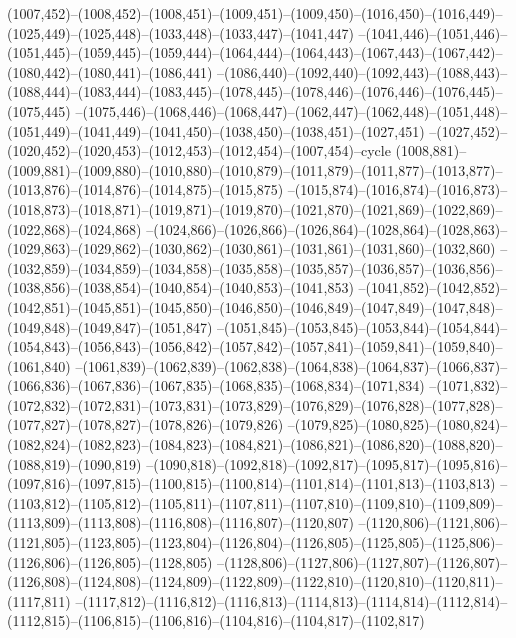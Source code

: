 (1007,452)--(1008,452)--(1008,451)--(1009,451)--(1009,450)--(1016,450)--(1016,449)--(1025,449)--(1025,448)--(1033,448)--(1033,447)--(1041,447)
--(1041,446)--(1051,446)--(1051,445)--(1059,445)--(1059,444)--(1064,444)--(1064,443)--(1067,443)--(1067,442)--(1080,442)--(1080,441)--(1086,441)
--(1086,440)--(1092,440)--(1092,443)--(1088,443)--(1088,444)--(1083,444)--(1083,445)--(1078,445)--(1078,446)--(1076,446)--(1076,445)--(1075,445)
--(1075,446)--(1068,446)--(1068,447)--(1062,447)--(1062,448)--(1051,448)--(1051,449)--(1041,449)--(1041,450)--(1038,450)--(1038,451)--(1027,451)
--(1027,452)--(1020,452)--(1020,453)--(1012,453)--(1012,454)--(1007,454)--cycle
(1008,881)--(1009,881)--(1009,880)--(1010,880)--(1010,879)--(1011,879)--(1011,877)--(1013,877)--(1013,876)--(1014,876)--(1014,875)--(1015,875)
--(1015,874)--(1016,874)--(1016,873)--(1018,873)--(1018,871)--(1019,871)--(1019,870)--(1021,870)--(1021,869)--(1022,869)--(1022,868)--(1024,868)
--(1024,866)--(1026,866)--(1026,864)--(1028,864)--(1028,863)--(1029,863)--(1029,862)--(1030,862)--(1030,861)--(1031,861)--(1031,860)--(1032,860)
--(1032,859)--(1034,859)--(1034,858)--(1035,858)--(1035,857)--(1036,857)--(1036,856)--(1038,856)--(1038,854)--(1040,854)--(1040,853)--(1041,853)
--(1041,852)--(1042,852)--(1042,851)--(1045,851)--(1045,850)--(1046,850)--(1046,849)--(1047,849)--(1047,848)--(1049,848)--(1049,847)--(1051,847)
--(1051,845)--(1053,845)--(1053,844)--(1054,844)--(1054,843)--(1056,843)--(1056,842)--(1057,842)--(1057,841)--(1059,841)--(1059,840)--(1061,840)
--(1061,839)--(1062,839)--(1062,838)--(1064,838)--(1064,837)--(1066,837)--(1066,836)--(1067,836)--(1067,835)--(1068,835)--(1068,834)--(1071,834)
--(1071,832)--(1072,832)--(1072,831)--(1073,831)--(1073,829)--(1076,829)--(1076,828)--(1077,828)--(1077,827)--(1078,827)--(1078,826)--(1079,826)
--(1079,825)--(1080,825)--(1080,824)--(1082,824)--(1082,823)--(1084,823)--(1084,821)--(1086,821)--(1086,820)--(1088,820)--(1088,819)--(1090,819)
--(1090,818)--(1092,818)--(1092,817)--(1095,817)--(1095,816)--(1097,816)--(1097,815)--(1100,815)--(1100,814)--(1101,814)--(1101,813)--(1103,813)
--(1103,812)--(1105,812)--(1105,811)--(1107,811)--(1107,810)--(1109,810)--(1109,809)--(1113,809)--(1113,808)--(1116,808)--(1116,807)--(1120,807)
--(1120,806)--(1121,806)--(1121,805)--(1123,805)--(1123,804)--(1126,804)--(1126,805)--(1125,805)--(1125,806)--(1126,806)--(1126,805)--(1128,805)
--(1128,806)--(1127,806)--(1127,807)--(1126,807)--(1126,808)--(1124,808)--(1124,809)--(1122,809)--(1122,810)--(1120,810)--(1120,811)--(1117,811)
--(1117,812)--(1116,812)--(1116,813)--(1114,813)--(1114,814)--(1112,814)--(1112,815)--(1106,815)--(1106,816)--(1104,816)--(1104,817)--(1102,817)
